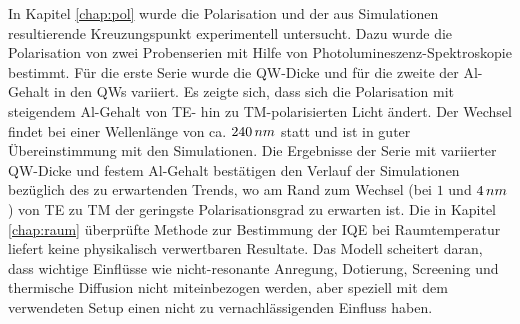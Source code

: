 \newline
In Kapitel \ref{chap:pol} wurde die Polarisation und der aus Simulationen resultierende Kreuzungspunkt experimentell untersucht. Dazu wurde die Polarisation von zwei Probenserien mit Hilfe von Photolumineszenz-Spektroskopie bestimmt. Für die erste Serie wurde die QW-Dicke und für die zweite der Al-Gehalt in den QWs variiert.
Es zeigte sich, dass sich die Polarisation mit steigendem Al-Gehalt von TE- hin zu TM-polarisierten Licht ändert. Der Wechsel findet bei einer Wellenlänge von ca. $240 \thinspace nm$ statt und ist in guter Übereinstimmung mit den Simulationen.
\newline
Die Ergebnisse der Serie mit variierter QW-Dicke und festem Al-Gehalt bestätigen den Verlauf der Simulationen bezüglich des zu erwartenden Trends, wo am Rand zum Wechsel (bei $1$ und $4 \thinspace nm$) von TE zu TM der geringste Polarisationsgrad zu erwarten ist. 
\newline
Die in Kapitel \ref{chap:raum} überprüfte Methode zur Bestimmung der IQE bei Raumtemperatur liefert keine physikalisch verwertbaren Resultate. Das Modell scheitert daran, dass wichtige Einflüsse wie nicht-resonante Anregung, Dotierung, Screening und thermische Diffusion nicht miteinbezogen werden, aber speziell mit dem verwendeten Setup einen nicht zu vernachlässigenden Einfluss haben.  

